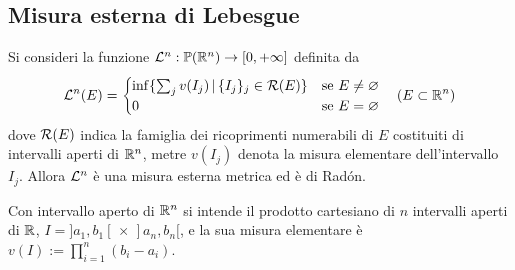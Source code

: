 \subsection{Misura esterna di Lebesgue}
\begin{shadedTheorem}\label{thm: lebesgue grande}
  Si consideri la funzione $\mathcal{L}^n:\mathbb{P}(\mathbb{R}^n)\to [0,+\infty]$ definita da 
  \[\mathcal{L}^n(E)=\begin{cases}
      \inf\{\sum_jv(I_j)\,|\,\{I_j\}_j\in \mathcal{R}(E)\} & \text{se }E\neq \varnothing\\
      0\ & \text{se } E=\varnothing
  \end{cases}\quad (E\subset \mathbb{R}^n)\]
  dove $\mathcal{R}(E)$ indica la famiglia dei ricoprimenti numerabili di $E$ costituiti di intervalli aperti di $\mathbb{R}^n$, metre $v(I_j)$ denota la misura elementare dell'intervallo $I_j$. Allora $\mathcal{L}^n$ è una misura esterna metrica ed è di Radón.
\end{shadedTheorem}
Con intervallo aperto di $\mathbb{R}^n$ si intende il prodotto cartesiano di $n$ intervalli aperti di $\mathbb{R}$, $I=]a_1,b_1[\,\times\,]a_n,b_n[$, e la sua misura elementare è $v(I):=\prod_{i=1}^n(b_i-a_i)$.
